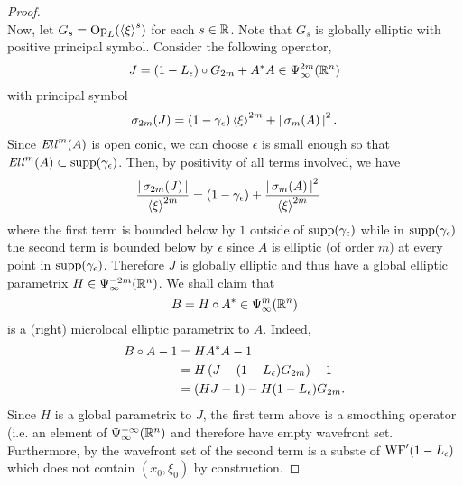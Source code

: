 \documentclass[12pt]{article}
\begin{document}
\begin{proof}
    \\
    Now, let $G_s = \mathrm{Op}_L(\sym[\xi]^s)$ for each $s \in \R$. Note that $G_s$ is globally elliptic with positive principal symbol. Consider the following operator, 
    \begin{align*}
        J = (1 - L_\epsilon) \circ G_{2m} + A^* A \in \Psi^{2m}_\infty(\R^n)
    \end{align*}
    with principal symbol 
    \[
    \sigma_{2m}(J) = (1 - \gamma_\epsilon)\sym[\xi]^{2m} + \abs{\sigma_m(A)}^2. 
    \]
    Since $\Ell^m(A)$ is open conic, we can choose $\epsilon$ is small enough so that $\Ell^{m}(A) \subset \supp(\gamma_\epsilon)$. Then, by positivity of all terms involved, we have
    \begin{align*}
        \frac{\abs{\sigma_{2m}(J)} }{\sym[\xi]^{2m}}
        &= (1 - \gamma_\epsilon) + \frac{\abs{\sigma_m(A)}^2}{\sym[\xi]^{2m}}
    \end{align*}
    where the first term is bounded below by $1$ outside of $\supp(\gamma_\epsilon)$ while in $\supp(\gamma_\epsilon)$ the second term is bounded below by $\epsilon$ since $A$ is elliptic (of order $m$) at every point in $\supp(\gamma_\epsilon)$. Therefore $J$ is globally elliptic and thus have a global elliptic parametrix $H \in \Psi^{-2m}_\infty(\R^n)$. We shall claim that 
    \[
    B = H \circ A^* \in \Psi^m_\infty(\R^n)
    \]
    is a (right) microlocal elliptic parametrix to $A$. Indeed, 
    \begin{align*}
        B \circ A - 1 
        &= H A^*A - 1 \\
        &= H\brac{J - (1 - L_\epsilon)G_{2m}} - 1\\
        &= (HJ - 1) - H(1 - L_\epsilon)G_{2m}. 
    \end{align*}
    Since $H$ is a global parametrix to $J$, the first term above is a smoothing operator (i.e. an element of $\Psi^{-\infty}_\infty(\R^n)$ and therefore have empty wavefront set. Furthermore, by \cite{wavefront of compositiion} the wavefront set of the second term is a subste of $\WF'(1 - L_\epsilon)$ which does not contain $(x_0, \xi_0)$ by construction. 
\end{proof}
\end{document}
